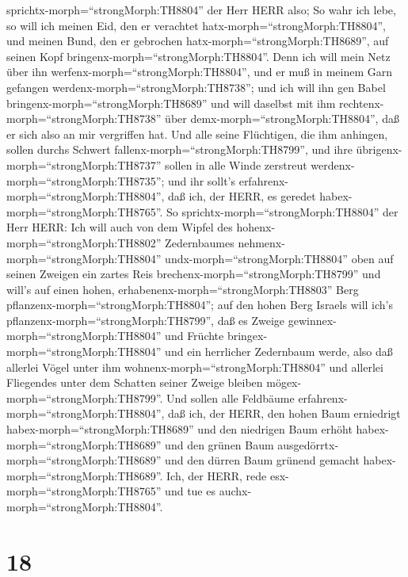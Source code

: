 sprichtx-morph=``strongMorph:TH8804'' der Herr HERR also; So wahr ich
lebe, so will ich meinen Eid, den er verachtet
hatx-morph=``strongMorph:TH8804'', und meinen Bund, den er gebrochen
hatx-morph=``strongMorph:TH8689'', auf seinen Kopf
bringenx-morph=``strongMorph:TH8804''.  Denn ich will mein
Netz über ihn werfenx-morph=``strongMorph:TH8804'', und er muß in meinem
Garn gefangen werdenx-morph=``strongMorph:TH8738''; und ich will ihn gen
Babel bringenx-morph=``strongMorph:TH8689'' und will daselbst mit ihm
rechtenx-morph=``strongMorph:TH8738'' über
demx-morph=``strongMorph:TH8804'', daß er sich also an mir vergriffen
hat.  Und alle seine Flüchtigen, die ihm anhingen, sollen
durchs Schwert fallenx-morph=``strongMorph:TH8799'', und ihre
übrigenx-morph=``strongMorph:TH8737'' sollen in alle Winde zerstreut
werdenx-morph=``strongMorph:TH8735''; und ihr sollt's
erfahrenx-morph=``strongMorph:TH8804'', daß ich, der HERR, es geredet
habex-morph=``strongMorph:TH8765''.  So
sprichtx-morph=``strongMorph:TH8804'' der Herr HERR: Ich will auch von
dem Wipfel des hohenx-morph=``strongMorph:TH8802'' Zedernbaumes
nehmenx-morph=``strongMorph:TH8804'' undx-morph=``strongMorph:TH8804''
oben auf seinen Zweigen ein zartes Reis
brechenx-morph=``strongMorph:TH8799'' und will's auf einen hohen,
erhabenenx-morph=``strongMorph:TH8803'' Berg
pflanzenx-morph=``strongMorph:TH8804'';  auf den hohen Berg
Israels will ich's pflanzenx-morph=``strongMorph:TH8799'', daß es Zweige
gewinnex-morph=``strongMorph:TH8804'' und Früchte
bringex-morph=``strongMorph:TH8804'' und ein herrlicher Zedernbaum
werde, also daß allerlei Vögel unter ihm
wohnenx-morph=``strongMorph:TH8804'' und allerlei Fliegendes unter dem
Schatten seiner Zweige bleiben mögex-morph=``strongMorph:TH8799''.
 Und sollen alle Feldbäume
erfahrenx-morph=``strongMorph:TH8804'', daß ich, der HERR, den hohen
Baum erniedrigt habex-morph=``strongMorph:TH8689'' und den niedrigen
Baum erhöht habex-morph=``strongMorph:TH8689'' und den grünen Baum
ausgedörrtx-morph=``strongMorph:TH8689'' und den dürren Baum grünend
gemacht habex-morph=``strongMorph:TH8689''. Ich, der HERR, rede
esx-morph=``strongMorph:TH8765'' und tue es
auchx-morph=``strongMorph:TH8804''.

\hypertarget{section-17}{%
\section{18}\label{section-17}}

